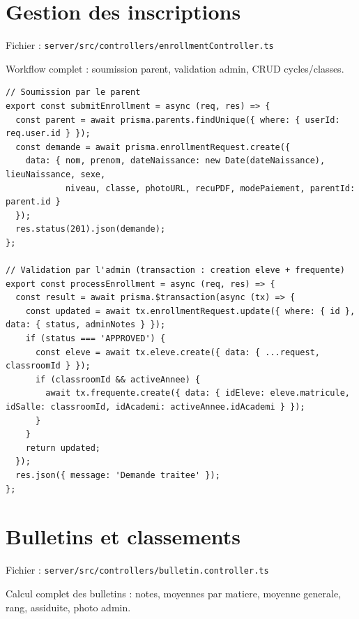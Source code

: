 \documentclass[12pt,a4paper]{article}
\begin{document}
\newpage

\section{Gestion des inscriptions}

Fichier : \texttt{server/src/controllers/enrollmentController.ts}

Workflow complet : soumission parent, validation admin, CRUD cycles/classes.

\begin{lstlisting}[style=code]
// Soumission par le parent
export const submitEnrollment = async (req, res) => {
  const parent = await prisma.parents.findUnique({ where: { userId: req.user.id } });
  const demande = await prisma.enrollmentRequest.create({
    data: { nom, prenom, dateNaissance: new Date(dateNaissance), lieuNaissance, sexe,
            niveau, classe, photoURL, recuPDF, modePaiement, parentId: parent.id }
  });
  res.status(201).json(demande);
};

// Validation par l'admin (transaction : creation eleve + frequente)
export const processEnrollment = async (req, res) => {
  const result = await prisma.$transaction(async (tx) => {
    const updated = await tx.enrollmentRequest.update({ where: { id }, data: { status, adminNotes } });
    if (status === 'APPROVED') {
      const eleve = await tx.eleve.create({ data: { ...request, classroomId } });
      if (classroomId && activeAnnee) {
        await tx.frequente.create({ data: { idEleve: eleve.matricule, idSalle: classroomId, idAcademi: activeAnnee.idAcademi } });
      }
    }
    return updated;
  });
  res.json({ message: 'Demande traitee' });
};
\end{lstlisting}

\newpage

\section{Bulletins et classements}

Fichier : \texttt{server/src/controllers/bulletin.controller.ts}

Calcul complet des bulletins : notes, moyennes par matiere, moyenne generale, rang, assiduite, photo admin.
\end{document}
